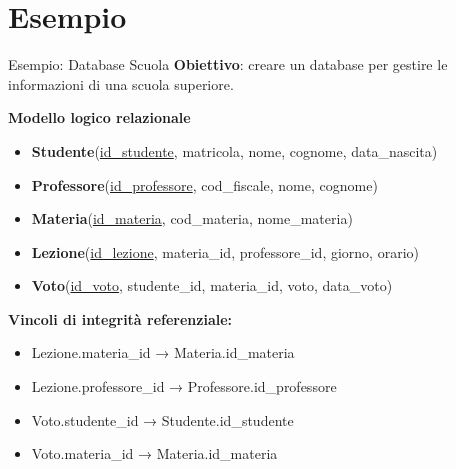 \documentclass{beamer}
\begin{document}
\section{Esempio}
\begin{frame}{Esempio: Database Scuola}
\textbf{Obiettivo}: creare un database per gestire le informazioni di una scuola superiore.

\medskip
\textbf{Modello logico relazionale}
\begin{itemize}
    \item \textbf{Studente}(\underline{id\_studente}, matricola, nome, cognome, data\_nascita)
    \item \textbf{Professore}(\underline{id\_professore}, cod\_fiscale, nome, cognome)
    \item \textbf{Materia}(\underline{id\_materia}, cod\_materia, nome\_materia)
    \item \textbf{Lezione}(\underline{id\_lezione}, materia\_id, professore\_id, giorno, orario)
    \item \textbf{Voto}(\underline{id\_voto}, studente\_id, materia\_id, voto, data\_voto)
\end{itemize}

\medskip 
\textbf{Vincoli di integrità referenziale:}
\begin{itemize}
    \item Lezione.materia\_id → Materia.id\_materia
    \item Lezione.professore\_id → Professore.id\_professore
    \item Voto.studente\_id → Studente.id\_studente
    \item Voto.materia\_id → Materia.id\_materia
\end{itemize}

\end{frame}
\end{document}
